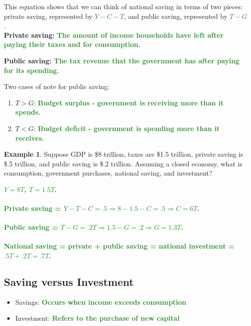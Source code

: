 \documentclass[11pt]{article}\usepackage[]{graphicx}\usepackage[]{color}
\theoremstyle{definition}
\newtheorem{exmp}{Example}[section]
\newcommand{\blank}[1]{}
\newcommand{\ddp}[1]{{\textbf{\textcolor{ForestGreen}{#1}}}}
\newcommand{\dd}[1]{{\underline{\textbf{\textcolor{ForestGreen}{#1}}}}}
\newcommand{\defn}[1]{\textbf{#1}}
\begin{document}
This equation shows that we can think of national saving in terms of two pieces: private saving, represented by \dd{$Y - C - T$}, and public saving, represented by \dd{$T - G$}.
\\

\defn{Private saving:} \ddp{The amount of income households have left after paying their taxes and for consumption.\\}

\defn{Public saving:} \ddp{The tax revenue that the government has after paying for its spending.\\}

Two cases of note for public saving:
\begin{enumerate}
	\setlength{\itemsep}{1em}
	\item $T > G$: \ddp{Budget surplus - government is receiving more than it spends.}
	\item $T < G$: \ddp{Budget deficit - government is spending more than it receives.}
\end{enumerate}

\begin{exmp}
Suppose GDP is \$8 trillion, taxes are \$1.5 trillion, private saving is \$.5 trillion, and public saving is \$.2 trillion. Assuming a closed economy, what is consumption, government purchases, national saving, and investment?
\end{exmp} 
\ddp{$Y = 8T$, $T = 1.5T$. \\\\
	Private saving = $Y - T - C = .5 \Rightarrow 8 - 1.5 - C = .5 \Rightarrow C = 6T$. \\\\
	Public saving = $T - G = .2T \Rightarrow 1.5 - G = .2 \Rightarrow G = 1.3T$. \\\\
	National saving = private + public saving = national investment = $.5T + .2T = .7T$.}
\blank{}
\blank{}

\subsection{Saving versus Investment}

\begin{itemize}
	\item Savings: \ddp{Occurs when income exceeds consumption}
	\item Investment: \ddp{Refers to the purchase of new capital}
\end{itemize}
\end{document}
